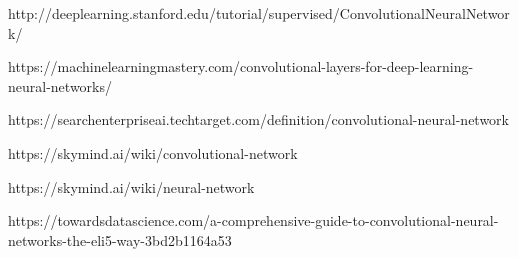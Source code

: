 \documentclass[runningheads,a4paper,11pt]{report}
\begin{document}

%
\begin{thebibliography}{1}
   http://deeplearning.stanford.edu/tutorial/supervised/ConvolutionalNeuralNetwork/

   https://machinelearningmastery.com/convolutional-layers-for-deep-learning-neural-networks/
  
   https://searchenterpriseai.techtarget.com/definition/convolutional-neural-network
  
   https://skymind.ai/wiki/convolutional-network
  
   https://skymind.ai/wiki/neural-network
  
   https://towardsdatascience.com/a-comprehensive-guide-to-convolutional-neural-networks-the-eli5-way-3bd2b1164a53
  
\end{thebibliography}
\end{document}
